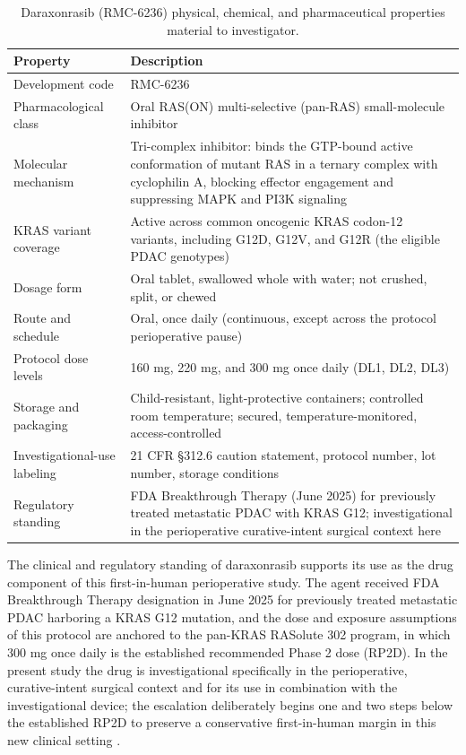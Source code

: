 \begin{table}[t]
\caption{Daraxonrasib (RMC-6236) physical, chemical, and pharmaceutical properties material to investigator.}
\label{tab:sec04-drugprops}
\centering
\begin{tabularx}{\textwidth}{L{4.0cm} Y}
\toprule
\textbf{Property} & \textbf{Description} \\
\midrule
Development code & RMC-6236 \\
Pharmacological class & Oral RAS(ON) multi-selective (pan-RAS) small-molecule inhibitor \\
Molecular mechanism & Tri-complex inhibitor: binds the GTP-bound active conformation of mutant RAS in a ternary complex with cyclophilin A, blocking effector engagement and suppressing MAPK and PI3K signaling \\
KRAS variant coverage & Active across common oncogenic KRAS codon-12 variants, including G12D, G12V, and G12R (the eligible PDAC genotypes) \\
Dosage form & Oral tablet, swallowed whole with water; not crushed, split, or chewed \\
Route and schedule & Oral, once daily (continuous, except across the protocol perioperative pause) \\
Protocol dose levels & 160 mg, 220 mg, and 300 mg once daily (DL1, DL2, DL3) \\
Storage and packaging & Child-resistant, light-protective containers; controlled room temperature; secured, temperature-monitored, access-controlled \\
Investigational-use labeling & 21 CFR \S 312.6 caution statement, protocol number, lot number, storage conditions \\
Regulatory standing & FDA Breakthrough Therapy (June 2025) for previously treated metastatic PDAC with KRAS G12; investigational in the perioperative curative-intent surgical context here \\
\bottomrule
\end{tabularx}
\vspace{-0.3cm}
\end{table}

The clinical and regulatory standing of daraxonrasib supports its use as the drug
component of this first-in-human perioperative study. The agent received FDA
Breakthrough Therapy designation in June 2025 for previously treated metastatic
PDAC harboring a KRAS G12 mutation, and the dose and exposure assumptions of this
protocol are anchored to the pan-KRAS RASolute 302 program, in which 300 mg once
daily is the established recommended Phase 2 dose (RP2D). In the present study the
drug is investigational specifically in the perioperative, curative-intent
surgical context and for its use in combination with the investigational device;
the escalation deliberately begins one and two steps below the established RP2D to
preserve a conservative first-in-human margin in this new clinical setting
\cite{daraxwhipple,natlpaiplatf}.


